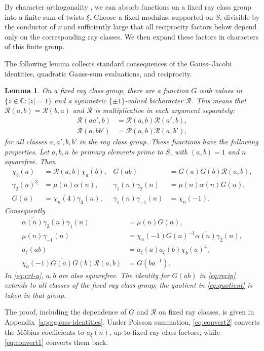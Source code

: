 \documentclass[11pt,a4paper]{article}
\numberwithin{equation}{section}
\numberwithin{figure}{section}
\newtheorem{lemma}[theorem]{Lemma}
\theoremstyle{definition}
\theoremstyle{remark}
\begin{document}
By character orthogonality \cite[\S3.1]{IK04}, we can absorb functions
on a fixed ray class group into a finite sum of twists $\xi$.
Choose a fixed modulus, supported on $S$, divisible by the conductor
of $\nu$ and sufficiently large that all reciprocity factors below
depend only on the corresponding ray classes. We then expand these
factors in characters of this finite group.

The following lemma collects standard consequences of the Gauss--Jacobi
identities, quadratic Gauss-sum evaluations, and reciprocity.

\begin{lemma}\label{lem:arithmetic}
On a fixed ray class group, there are a function $G$ with values in
$\{z\in\mathbb C:|z|=1\}$ and a symmetric $\{\pm1\}$-valued
bicharacter $\mathcal R$. This means that $\mathcal R(a,b)=\mathcal R(b,a)$ and $\mathcal R$ is
multiplicative in each argument separately:
\[
 \begin{aligned}
 \mathcal R(aa',b)&=\mathcal R(a,b)\mathcal R(a',b),\\
 \mathcal R(a,bb')&=\mathcal R(a,b)\mathcal R(a,b'),
 \end{aligned}
\]
for all classes $a,a',b,b'$ in the ray class group.
These functions have the following properties.
Let $a,b,n$ be primary elements prime to $S$, with $(a,b)=1$ and
$n$ squarefree. Then
\begin{align}
 \chi_b(a)&=\mathcal R(a,b)\chi_a(b),&
 G(ab)&=G(a)G(b)\mathcal R(a,b),                                      \label{eq:recip}\\
 \gamma_2(n)^3&=\mu(n)\alpha(n),&
 \gamma_1(n)\gamma_2(n)&=\mu(n)\alpha(n)G(n),                 \label{eq:gj}\\
 G(n)&=\overline{\chi_n(4)}\gamma_3(n),&
 \gamma_1(n)\gamma_{-1}(n)&=\chi_n(-1).                     \label{eq:g}
\end{align}
Consequently
\begin{align}
 \overline{\alpha(n)}\gamma_2(n)\gamma_1(n)&=\mu(n)G(n),\label{eq:convert1}\\
 \mu(n)\gamma_{-1}(n)
 &=\chi_n(-1)G(n)^{-1}\overline{\alpha(n)}\gamma_2(n),\label{eq:convert2}\\
 a_\xi(ab)&=a_\xi(a)a_\xi(b)\chi_b(a)^4,                     \label{eq:crt-a}\\
 \chi_a(-1)\overline{G(a)}G(b)\mathcal R(a,b)&=G(ba^{-1}).            \label{eq:quotient}
\end{align}
In \eqref{eq:crt-a}, $a,b$ are also squarefree.
The identity for $G(ab)$ in \eqref{eq:recip} extends to all classes of the fixed ray class
group; the quotient in \eqref{eq:quotient} is taken in that group.
\end{lemma}
The proof, including the dependence of $G$ and $\mathcal R$ on fixed ray
classes, is given in Appendix~\ref{app:gauss-identities}.
Under Poisson summation, \eqref{eq:convert2} converts the M\"obius
coefficients to $a_\xi(n)$, up to fixed ray class factors, while
\eqref{eq:convert1} converts them back.
\end{document}
